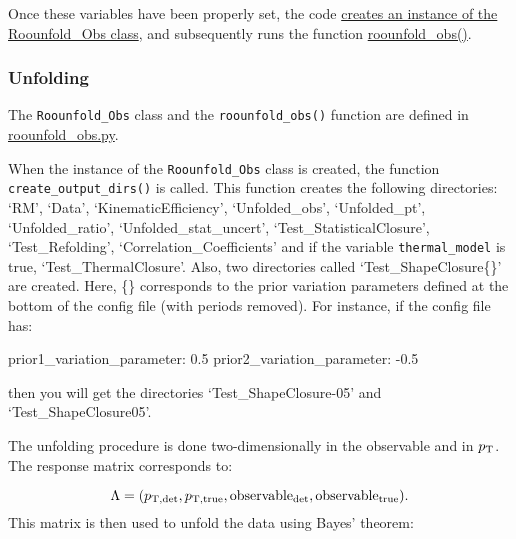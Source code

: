 \documentclass[12pt]{article}
\begin{document}
Once these variables have been properly set, the code
\href{https://github.com/reynier0611/pyjetty/blob/master/pyjetty/alice_analysis/analysis/user/substructure/run_analysis.py#L292}{creates an instance of the Roounfold\_Obs class}, and subsequently
runs the function \href{https://github.com/reynier0611/pyjetty/blob/master/pyjetty/alice_analysis/analysis/user/substructure/run_analysis.py#L297}{roounfold\_obs()}.

\subsubsection{Unfolding}

The \verb|Roounfold_Obs| class and the \verb|roounfold_obs()| function are defined in \href{https://github.com/reynier0611/pyjetty/blob/master/pyjetty/alice_analysis/analysis/user/substructure/roounfold_obs.py}{roounfold\_obs.py}.
 
When the instance of the \verb|Roounfold_Obs| class is created, the function \verb|create_output_dirs()| is called. This function creates the following directories:
`RM', `Data', `KinematicEfficiency', `Unfolded\_obs', `Unfolded\_pt', `Unfolded\_ratio', `Unfolded\_stat\_uncert', `Test\_StatisticalClosure', `Test\_Refolding', `Correlation\_Coefficients' and
if the variable \verb|thermal_model| is true, `Test\_ThermalClosure'.
Also, two directories called `Test\_ShapeClosure\{\}' are created. Here, \{\} corresponds to the prior variation parameters defined at the bottom of the config file (with periods removed).
For instance, if the config file has:

\begin{tcolorbox}
\begin{verbnobox}[\scriptsize]
prior1_variation_parameter: 0.5
prior2_variation_parameter: -0.5
\end{verbnobox}  
\end{tcolorbox}

then you will get the directories `Test\_ShapeClosure-05' and `Test\_ShapeClosure05'.

The unfolding procedure is done two-dimensionally in the observable and in $p_{\rm T}$.
The response matrix corresponds to:

\begin{equation}
\Lambda = (p_{\rm T, det}, p_{\rm T, true}, {\rm observable_{det}}, {\rm observable_{true}}).
\end{equation}
This matrix is then used to unfold the data using Bayes' theorem:
\end{document}
